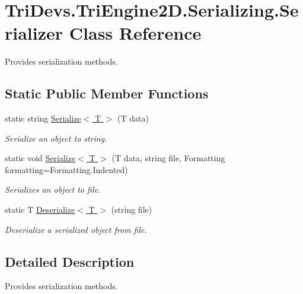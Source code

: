 \hypertarget{class_tri_devs_1_1_tri_engine2_d_1_1_serializing_1_1_serializer}{\section{Tri\-Devs.\-Tri\-Engine2\-D.\-Serializing.\-Serializer Class Reference}
\label{class_tri_devs_1_1_tri_engine2_d_1_1_serializing_1_1_serializer}
}


Provides serialization methods.  


\subsection*{Static Public Member Functions}
\begin{DoxyCompactItemize}
\item 
static string \hyperlink{class_tri_devs_1_1_tri_engine2_d_1_1_serializing_1_1_serializer_a502d20061e461d56bd72a3d5a9cad1fc}{Serialize$<$ T $>$} (T data)
\begin{DoxyCompactList}\small\item\em Serialize an object to string. \end{DoxyCompactList}\item 
static void \hyperlink{class_tri_devs_1_1_tri_engine2_d_1_1_serializing_1_1_serializer_aa434aee0925b683112dd359d1506c835}{Serialize$<$ T $>$} (T data, string file, Formatting formatting=Formatting.\-Indented)
\begin{DoxyCompactList}\small\item\em Serializes an object to file. \end{DoxyCompactList}\item 
static T \hyperlink{class_tri_devs_1_1_tri_engine2_d_1_1_serializing_1_1_serializer_a2687e279029d9bdf825ec60f7143e341}{Deserialize$<$ T $>$} (string file)
\begin{DoxyCompactList}\small\item\em Deserialize a serialized object from file. \end{DoxyCompactList}\end{DoxyCompactItemize}


\subsection{Detailed Description}
Provides serialization methods. 



